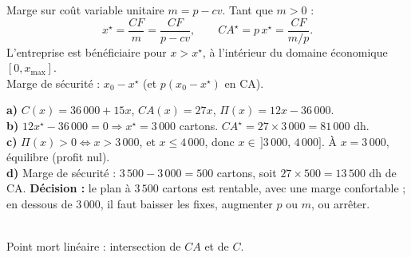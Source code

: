 \documentclass[12pt,a4paper]{article}
\begin{document}
\begin{methodebox}
Marge sur coût variable unitaire $m=p-cv$. Tant que $m>0$ :
$$x^\star = \frac{CF}{m} = \frac{CF}{p-cv}, \qquad CA^\star = p\,x^\star = \frac{CF}{m/p}.$$
L'entreprise est bénéficiaire pour $x>x^\star$, à l'intérieur du domaine économique $[0,x_{\max}]$.\\
Marge de sécurité : $x_0-x^\star$ (et $p(x_0-x^\star)$ en CA).
\end{methodebox}

\begin{corrigebox}[Partie A]
\textbf{a)} $C(x)=36\,000+15x$, $CA(x)=27x$, $\Pi(x)=12x-36\,000$.\\
\textbf{b)} $12x^\star-36\,000=0 \Rightarrow x^\star = 3\,000$ cartons. $CA^\star = 27\times 3\,000 = 81\,000$ dh.\\
\textbf{c)} $\Pi(x)>0 \Leftrightarrow x>3\,000$, et $x\leqslant 4\,000$, donc $x\in\,]3\,000,\,4\,000]$. À $x=3\,000$, équilibre (profit nul).\\
\textbf{d)} Marge de sécurité : $3\,500-3\,000=500$ cartons, soit $27\times 500=13\,500$ dh de CA. \textbf{Décision :} le plan à $3\,500$ cartons est rentable, avec une marge confortable ; en dessous de $3\,000$, il faut baisser les fixes, augmenter $p$ ou $m$, ou arrêter.
\end{corrigebox}

\begin{center}
\\
{\small\color{mundigray} Point mort linéaire : intersection de $CA$ et de $C$.}
\end{center}
\end{document}
